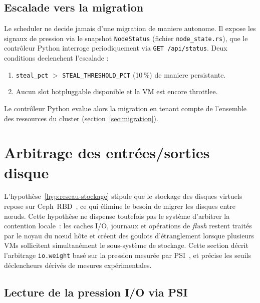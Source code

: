 \subsection{Escalade vers la migration}
\label{subsec:escalade-migration}

Le scheduler ne decide jamais d'une migration de maniere autonome. Il expose les signaux de pression via le snapshot \texttt{NodeStatus} (fichier \texttt{node\_state.rs}), que le contr\^oleur Python interroge periodiquement via \texttt{GET /api/status}. Deux conditions declenchent l'escalade :

\begin{enumerate}
    \item \texttt{steal\_pct} $>$ \texttt{STEAL\_THRESHOLD\_PCT} (10\,\%) de maniere persistante.
    \item Aucun slot hotpluggable disponible et la VM est encore throttlee.
\end{enumerate}

Le contr\^oleur Python evalue alors la migration en tenant compte de l'ensemble des ressources du cluster (section~\ref{sec:migration}).

\section{Arbitrage des entrées/sorties disque}
\label{sec:disk-scheduler}

L'hypothèse~\ref{hyp:reseau-stockage} stipule que le stockage des disques virtuels repose sur Ceph~RBD~\cite{ceph_doc}, ce qui élimine le besoin de migrer les disques entre nœuds. Cette hypothèse ne dispense toutefois pas le système d'arbitrer la contention locale~: les caches I/O, journaux et opérations de \textit{flush} restent traités par le noyau du nœud hôte et créent des goulots d'étranglement lorsque plusieurs VMs sollicitent simultanément le sous-système de stockage. Cette section décrit l'arbitrage \texttt{io.weight} basé sur la pression mesurée par PSI~\cite{psi_doc}, et précise les seuils déclencheurs dérivés de mesures expérimentales.

\subsection{Lecture de la pression I/O via PSI}
\label{subsec:psi-io}

